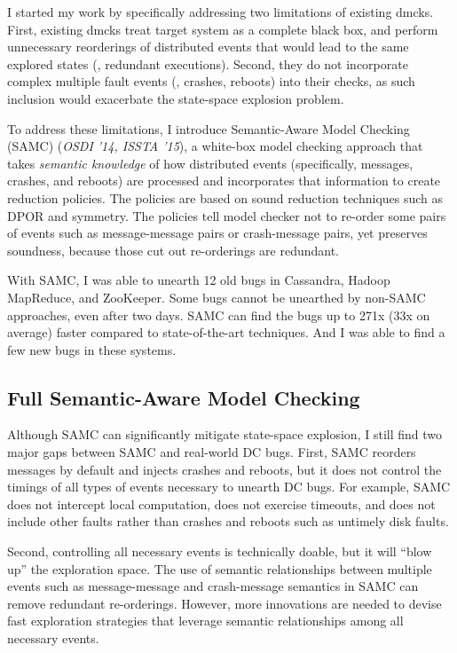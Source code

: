 \documentclass[11pt]{article}
\begin{document}
I started my work by specifically addressing two limitations of existing dmcks.
First, existing dmcks treat target system as a complete black box, and perform
unnecessary reorderings of distributed events that would lead to the same
explored states (\ie, redundant executions). Second, they do not incorporate
complex multiple fault events (\eg, crashes, reboots) into their checks, as
such inclusion would exacerbate the state-space explosion problem.

To address these limitations, I introduce Semantic-Aware Model Checking (SAMC)
(\textit{OSDI '14, ISSTA '15}), a white-box model checking approach that takes
\textit{semantic knowledge} of how distributed events (specifically, messages,
crashes, and reboots) are processed and incorporates that information to create
reduction policies. The policies are based on sound reduction techniques such
as DPOR and symmetry. The policies tell model checker not to re-order some
pairs of events such as message-message pairs or crash-message pairs, yet
preserves soundness, because those cut out re-orderings are redundant.

With SAMC, I was able to unearth 12 old bugs in Cassandra, Hadoop MapReduce,
and ZooKeeper. Some bugs cannot be unearthed by non-SAMC approaches, even after
two days. SAMC can find the bugs up to 271x (33x on average) faster compared to
state-of-the-art techniques. And I was able to find a few new bugs in these
systems.

\subsection{Full Semantic-Aware Model Checking} 

Although SAMC can significantly mitigate state-space explosion, I still find two
major gaps between SAMC and real-world DC bugs. First, SAMC reorders messages by
default and injects crashes and reboots, but it does not control the timings of
all types of events necessary to unearth DC bugs. For example, SAMC does not
intercept local computation, does not exercise timeouts, and does not include
other faults rather than crashes and reboots such as untimely disk faults.

Second, controlling all necessary events is technically doable, but it will
``blow up'' the exploration space. The use of semantic relationships between
multiple events such as message-message and crash-message semantics in SAMC can
remove redundant re-orderings. However, more innovations are needed to devise
fast exploration strategies that leverage semantic relationships among all
necessary events.
\end{document}
